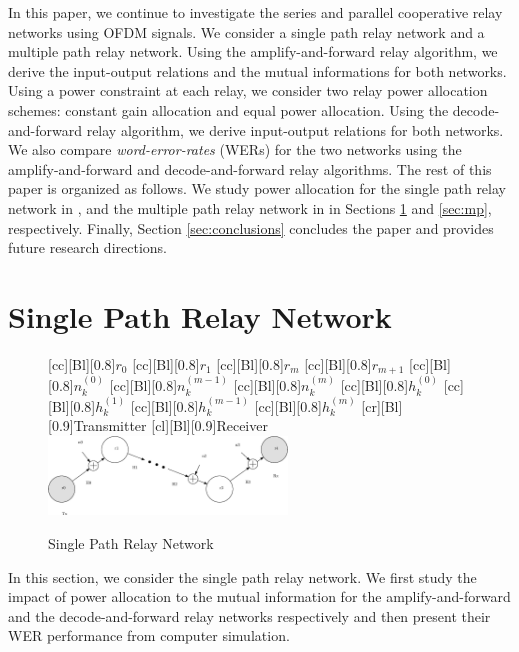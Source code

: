 \documentclass[journal]{IEEEtran}
\begin{document}
In this paper, we continue to investigate the series and parallel cooperative relay networks using OFDM signals.  We consider a single path relay network and a multiple path relay network.  Using the amplify-and-forward relay algorithm, we derive the input-output relations and the mutual informations for both networks.  Using a power constraint at each relay, we consider two relay power allocation schemes: constant gain allocation and equal power allocation. Using the decode-and-forward relay algorithm, we derive input-output relations for both networks.  We also compare {\em word-error-rates} (WERs) for the two networks using the amplify-and-forward and decode-and-forward relay algorithms.
The rest of this paper is organized as follows.  We study power allocation for the single path relay network in \cite{article:Hasna02}, \cite{article:Hasna01} and the multiple path relay network in \cite{article:Adve01} in Sections \ref{sec:sp} and  \ref{sec:mp}, respectively.  Finally, Section \ref{sec:conclusions} concludes the paper and provides future research directions.

\section{Single Path Relay Network}
\label{sec:sp}

\begin{figure}
  \centering
    [cc][Bl][0.8]{$r_0$}
    [cc][Bl][0.8]{$r_1$}
    [cc][Bl][0.8]{$r_m$}
    [cc][Bl][0.8]{$r_{m+1}$}
    [cc][Bl][0.8]{$n_k^{(0)}$}
    [cc][Bl][0.8]{$n_k^{(m-1)}$}
    [cc][Bl][0.8]{$n_k^{(m)}$}
    [cc][Bl][0.8]{$h_k^{(0)}$}
    [cc][Bl][0.8]{$h_k^{(1)}$}
    [cc][Bl][0.8]{$h_k^{(m-1)}$}
    [cc][Bl][0.8]{$h_k^{(m)}$}
    [cr][Bl][0.9]{Transmitter}
    [cl][Bl][0.9]{Receiver}
    \includegraphics[width=2.5in]{sp_model.eps}
   \caption{Single Path Relay Network \label{fig:sp_sm} }
\end{figure}

In this section, we consider the single path relay network.  We first study the impact of power allocation to the mutual information for the amplify-and-forward and the decode-and-forward relay networks respectively and then present their WER performance from computer simulation.
\end{document}
